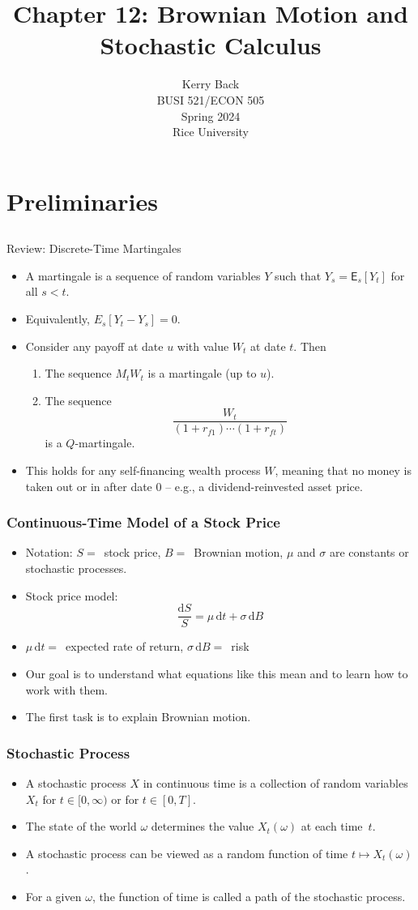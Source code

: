 \documentclass[10pt]{beamer}
\title{Chapter 12: Brownian Motion and Stochastic Calculus}
\date{}
\author{Kerry Back\\ 
BUSI 521/ECON 505\\
Spring 2024\\
Rice University}
\newcommand{\bi}{\begin{itemize}}
\newcommand{\ei}{\end{itemize}}
\newcommand{\im}{\item}
\newcommand{\D}{\mathrm{d}}
\newcommand{\mye}{\ensuremath{\mathsf{E}}}
\newcommand{\bfr}{\begin{frame}}
\begin{document}
\maketitle

\section{Preliminaries}\subsection{}

\begin{frame}{Review: Discrete-Time Martingales}
          \bi 
        \im A martingale is a sequence of random variables $Y$ such that $Y_s = \mye_s[Y_t]$ for all $s<t$.
        \im Equivalently, $E_s[Y_t-Y_s] = 0$.
        \im Consider any payoff at date $u$ with value $W_t$ at date $t$.  Then
        \begin{enumerate}
            \im The sequence $M_tW_t$ is a martingale (up to $u$).
            \im The sequence
            $$\frac{W_t}{(1+r_{f1}) \cdots (1+r_{ft})}$$
            is a $Q$-martingale.
        \end{enumerate}
        \im This holds for any self-financing wealth process $W$, meaning that no money is taken out or in after date 0 -- e.g., a dividend-reinvested asset price.
        \ei
\end{frame}

\bfr\frametitle{Continuous-Time Model of a Stock Price}
\bi
\im Notation: 
$S=\,$ stock price, $B = \,$ Brownian motion, $\mu$ and $\sigma$ are constants or stochastic processes.
\im Stock price model:
$$\frac{\D S}{S}=\mu\,\D t+\sigma\,\D B$$
\im 
$\mu\,\D t =\,$ expected rate of return, $\sigma\,\D B=\,$ risk
\im Our goal is to understand what equations like this mean and to learn how to work with them.
\im The first task is to explain Brownian motion.
\ei
\end{frame}

\bfr\frametitle{Stochastic Process}
\bi
\im A stochastic process $X$ in continuous time is a collection of random variables  $X_t$ for $t\in [0,\infty)$ or for $t\in[0,T]$.  
\im The state of the world $\omega$ determines the value $X_t(\omega)$ at each time~$t$.  
\im A stochastic process can be viewed as a random function of time $t \mapsto X_t(\omega)$.  
\im For a given $\omega$, the function of time is called a path of the stochastic process.
\ei
\end{frame}
\end{document}
